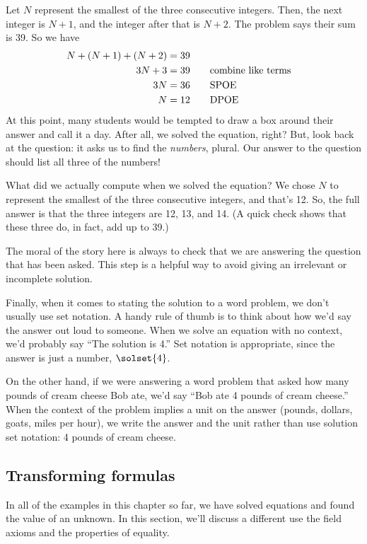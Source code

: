 Let $N$ represent the smallest of the three consecutive integers. Then, the next integer is $N+1$, and the integer after that is $N+2$. The problem says their sum is 39. So we have
\[\begin{aligned}
N + (N+1) + (N+2) &=  39\\
3N + 3 &= 39
&& \text{\quad combine like terms}\\
3N &= 36
&& \text{\quad SPOE}\\
N &= 12
&& \text{\quad DPOE}\\
\end{aligned}\]
At this point, many students would be tempted to draw a box around their answer and call it a day. After all, we solved the equation, right? But, look back at the question: it asks us to find the \textit{numbers}, plural. Our answer to the question should list all three of the numbers!

What did we actually compute when we solved the equation? We chose $N$ to represent the smallest of the three consecutive integers, and that's 12. So, the full answer is that the three integers are 12, 13, and 14. (A quick check shows that these three do, in fact, add up to 39.)

The moral of the story here is always to check that we are answering the question that has been asked. This step is a helpful way to avoid giving an irrelevant or incomplete solution.

Finally, when it comes to stating the solution to a word problem, we don't usually use set notation. A handy rule of thumb is to think about how we'd say the answer out loud to someone. When we solve an equation with no context, we'd probably say ``The solution is 4.'' Set notation is appropriate, since the answer is just a number, $\solset{4}$.

On the other hand, if we were answering a word problem that asked how many pounds of cream cheese Bob ate, we'd say ``Bob ate 4 pounds of cream cheese.'' When the context of the problem implies a unit on the answer (pounds, dollars, goats, miles per hour), we write the answer and the unit rather than use solution set notation: 4 pounds of cream cheese.

\subsection{Transforming formulas}
\label{sec:transformingformulas}

In all of the examples in this chapter so far, we have solved equations and found the value of an unknown. In this section, we'll discuss a different use the field axioms and the properties of equality.

